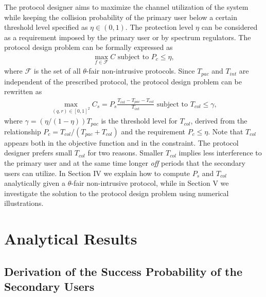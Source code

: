 \documentclass[12pt,draftclsnofoot,onecolumn]{IEEEtran}
\begin{document}
The protocol designer aims to maximize the channel utilization
of the system while keeping the collision probability
of the primary user below a certain threshold level specified as $\eta \in (0,1)$.
The protection level $\eta$ can be considered as a requirement imposed by the primary user
or by spectrum regulators.
The protocol design problem can be formally expressed as
\begin{align*}
\max_{f \in \mathcal{F}} C \textrm{ subject to } P_c \leq \eta,
\end{align*}
where $\mathcal{F}$ is the set of all $\theta$-fair non-intrusive protocols.
Since $T_{pac}$ and $T_{int}$ are independent of the prescribed
protocol, the protocol design problem can be rewritten as
\begin{align} \label{eq:probprot}
\max_{(q,r) \in [0,1]^2} C_s = P_s \frac{T_{int} - T_{pac} - T_{col}}{T_{int}} \textrm{ subject to } T_{col} \leq \gamma,
\end{align}
where $\gamma = (\eta/(1-\eta)) T_{pac}$ is the threshold level for
$T_{col}$, derived from the relationship $P_c = T_{col}/(T_{pac}+T_{col})$
and the requirement $P_c \leq \eta$.
Note that $T_{col}$ appears both in the objective function and in the constraint.
The protocol designer prefers small $T_{col}$ for two reasons. Smaller
$T_{col}$ implies less interference to the primary user and at the same time
longer \emph{off} periods that the secondary users can utilize.
In Section IV we explain how to compute $P_s$ and $T_{col}$ analytically given
a $\theta$-fair non-intrusive protocol,
while in Section V we investigate the solution to the protocol design problem using numerical illustrations.

\section{Analytical Results}

\subsection{Derivation of the Success Probability of the Secondary Users}
\end{document}
